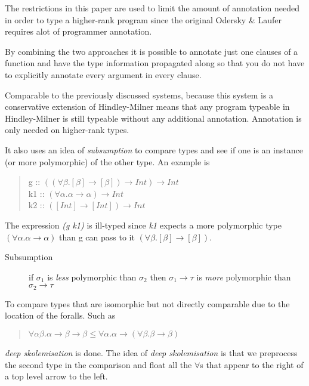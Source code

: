 \documentclass[12pt, a4paper, oneside]{article}
\begin{document}
The restrictions in this paper are used to limit the amount of annotation needed in order to type a higher-rank program since the original Odersky \& Laufer\cite{odesky} requires alot of programmer annotation.

By combining the two approaches it is possible to annotate just one clauses of a function and have the type information propagated along so that you do not have to explicitly annotate every argument in every clause.

Comparable to the previously discussed systems, because this system is a conservative extension of Hindley-Milner means that any program typeable in Hindley-Milner is still typeable without any additional annotation. Annotation is only needed on higher-rank types.

It also uses an idea of \textit{subsumption} to compare types and see if one is an instance (or more polymorphic) of the other type. An example is

\begin{quotation}
g :: $((\forall\beta.[\beta] \rightarrow [\beta]) \rightarrow Int) \rightarrow Int$ \\
\indent k1 :: $(\forall\alpha. \alpha \rightarrow \alpha) \rightarrow Int$\\
\indent k2 :: $([Int] \rightarrow [Int]) \rightarrow Int$
\end{quotation}

The expression \textit{(g k1)} is ill-typed since \textit{k1} expects a more polymorphic type $(\forall\alpha. \alpha \rightarrow \alpha)$ than g can pass to it $(\forall\beta.[\beta] \rightarrow [\beta])$. 

\begin{description}
\item[Subsumption] if $\sigma_1$ is \textit{less} polymorphic than $\sigma_2$ then $\sigma_1 \rightarrow \tau$ is \textit{more} polymorphic than $\sigma_2 \rightarrow \tau$
\end{description}

To compare types that are isomorphic but not directly comparable due to the location of the foralls. Such as
\begin{quotation}
$\forall\alpha\beta.\alpha\rightarrow\beta\rightarrow\beta\leq\forall\alpha.\alpha\rightarrow(\forall\beta.\beta\rightarrow\beta)$
\end{quotation}

\textit{deep skolemisation} is done. The idea of \textit{deep skolemisation} is that we preprocess the second type in the comparison and float all the $\forall$s that appear to the right of a top level arrow to the left.
\end{document}
